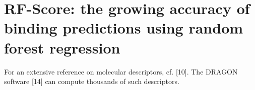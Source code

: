 \chapter{RF-Score: the growing accuracy of binding predictions using random forest regression}

\citep{1389} For an extensive reference on molecular descriptors, cf. [10]. The DRAGON software [14] can compute thousands of such descriptors.

\chapterend
